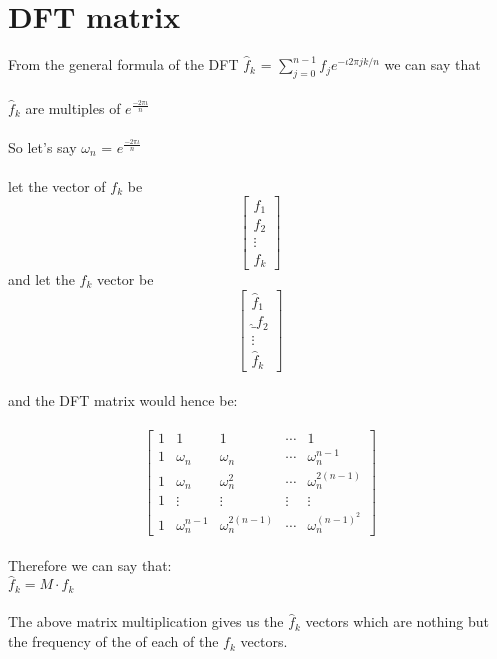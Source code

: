 \documentclass{article}
\begin{document}
\section{DFT matrix}
From the general formula of the DFT $\hat{f}_{k}$ = $\displaystyle \sum_{j = 0}^{n - 1} f_{j} e^{-\iota 2 \pi j k / n}$ we can say that\\
\\
$\hat{f}_{k}$ are multiples of $e^{\frac{- 2 \pi \iota }{n}}$\\
\\
So let's say $\omega_{n}$ = $e^{\frac{- 2 \pi \iota }{n}}$\\
\\
let the vector of $f_{k}$ be\\
$$\begin{bmatrix} f_{1}\\ f_{2} \\ \vdots \\ f_{k} \end{bmatrix}$$
and let the $\hat{f}_{k}$ vector be\\
$$\begin{bmatrix} \hat{f}_{1}\\ \hat_{f}_{2}\\ \vdots \\ \hat{f}_{k} \end{bmatrix}$$
\\
and the DFT matrix would hence be:\\
\\
$$ 
\begin{bmatrix}
1 & 1 & 1 & \cdots & 1 \\
1 & \omega_{n} & \omega_{n} & \cdots & \omega_{n}^{n-1} \\
1 & \omega_{n} & \omega_{n}^{2} & \cdots & \omega_{n}^{2 (n - 1)}\\
1 & \vdots & \vdots & \vdots & \vdots\\
1 & \omega_{n}^{n-1} & \omega_{n}^{2 (n - 1)}& \cdots & \omega_{n}^{(n-1)^{2}}
\end{bmatrix}
$$
\\
Therefore we can say that:\\
$\hat{f}_{k} = M \cdot f_{k}$\\
\\
The above matrix multiplication gives us the $\hat{f}_{k}$ vectors which are nothing but the frequency of the of each of the $f_{k}$ vectors.\\
\\
\end{document}
